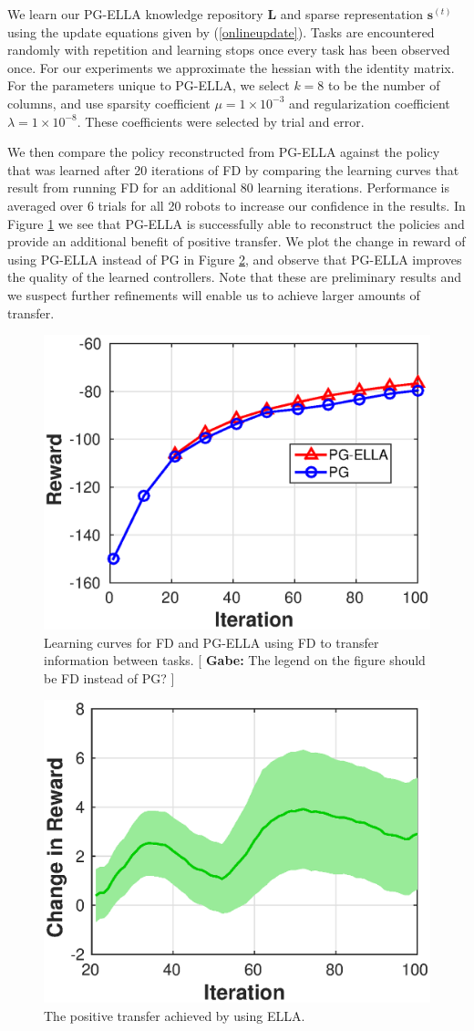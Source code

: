 \documentclass{aamas2016}
\newcommand{\note}[3]{{\color{#2} [ \ding{42} \textbf{#1:} {\small #3} ]}}
\newcommand{\comGabe}[1]{\note{Gabe}{cyan}{#1}}
\begin{document}
We learn our PG-ELLA knowledge repository $\bm{L}$ and sparse representation $\bm{s}^{(t)}$ using the update equations given 
by (\ref{onlineupdate}). Tasks are encountered randomly with repetition and learning stops once every task has been observed 
once. For our experiments we approximate the hessian with the identity matrix. For the parameters unique to PG-ELLA, we select $k=8$ to be the number of columns, and use sparsity coefficient $\mu = 1\times 10^{-3}$ and regularization coefficient $\lambda = 1\times 10^{-8}$. These coefficients were selected by trial and error. 

We then compare the policy reconstructed from PG-ELLA against the policy that was learned after 20 iterations of FD by comparing the learning curves that result from running FD for an additional 80 learning iterations. Performance is averaged over 6 trials for all 20 robots to increase our confidence in the results. In Figure \ref{fig:reward} we see that PG-ELLA is successfully able to reconstruct the policies and provide an additional benefit of positive transfer. We plot the change in reward of using PG-ELLA instead of PG in Figure \ref{fig:gain}, and observe that PG-ELLA improves the quality of the learned controllers. Note that these are preliminary results and we suspect further refinements will enable us to achieve larger amounts of transfer.

\begin{figure}[!htbp]
    \centering
        \includegraphics[width=.42\textwidth]{images/2016_02_06_learning.eps}
        \caption{Learning curves for FD and PG-ELLA using FD to transfer information between tasks. \comGabe{The legend on the figure should be FD instead of PG?} }\label{fig:reward}
\end{figure}

\begin{figure}[!htbp]
    \centering
        \includegraphics[width=.42\textwidth]{images/2016_02_06_gain.eps}
        \caption{The positive transfer achieved by using ELLA. }\label{fig:gain}
\end{figure}
\end{document}

